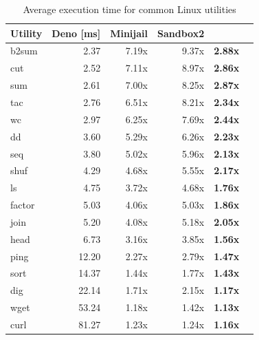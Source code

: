 \begin{table}[!t]
	\centering
    \setlength{\tabcolsep}{3mm}
	\begin{tabular*}{0.8\columnwidth}{l r r r r r}
		\toprule
		{\bf Utility} & {\bf Deno \scriptsize{[ms]}} & {\bf Minijail} & {\bf Sandbox2} & {\bf \pap}\\
		\midrule
		b2sum   & 2.37      & 7.19x     & 9.37x & \bf{2.88x}    \\
		cut     & 2.52      & 7.11x     & 8.97x & \bf{2.86x}    \\
		sum     & 2.61      & 7.00x     & 8.25x & \bf{2.87x}    \\
		tac     & 2.76      & 6.51x     & 8.21x & \bf{2.34x}    \\
		wc      & 2.97      & 6.25x     & 7.69x & \bf{2.44x}    \\
		dd      & 3.60      & 5.29x     & 6.26x & \bf{2.23x}    \\
		seq     & 3.80      & 5.02x     & 5.96x & \bf{2.13x}    \\
		shuf    & 4.29      & 4.68x     & 5.55x & \bf{2.17x}    \\
		ls      & 4.75      & 3.72x     & 4.68x & \bf{1.76x}    \\
		factor  & 5.03      & 4.06x     & 5.03x & \bf{1.86x}    \\
		join    & 5.20      & 4.08x     & 5.18x & \bf{2.05x}    \\
		head    & 6.73      & 3.16x     & 3.85x & \bf{1.56x}    \\
		ping    & 12.20     & 2.27x     & 2.79x & \bf{1.47x}    \\
		sort    & 14.37     & 1.44x     & 1.77x & \bf{1.43x}    \\
		dig     & 22.14     & 1.71x     & 2.15x & \bf{1.17x}    \\
		wget    & 53.24     & 1.18x     & 1.42x & \bf{1.13x}    \\
		curl    & 81.27     & 1.23x     & 1.24x & \bf{1.16x}    \\
		\bottomrule
	\end{tabular*}
	\caption{\label{table:common-linux-utils} Average execution time
	  for common Linux utilities}
\end{table}
%
